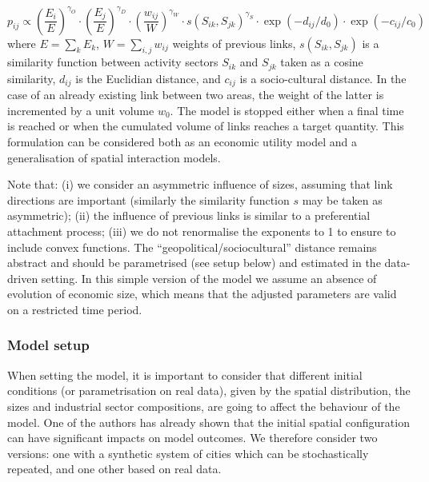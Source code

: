 \documentclass[10pt,letterpaper]{article}
\begin{document}
\begin{equation}
p_{ij} \propto \left(\frac{E_{i}}{E}\right)^{\gamma_O} \cdot \left(\frac{E_{j}}{E}\right)^{\gamma_D} \cdot \left(\frac{w_{ij}}{W}\right)^{\gamma_W} \cdot s\left(S_{ik},S_{jk}\right)^{\gamma_S} \cdot \exp \left(- d_{ij} / d_0\right) \cdot \exp \left(- c_{ij} / c_0\right)
\end{equation}
where $E  =  \sum_k E_k$, $W  = \sum_{i,j} w_{ij}$ weights of previous links, $s(S_{ik},S_{jk})$ is a similarity function between activity sectors $S_{ik}$ and $S_{jk}$ taken as a cosine similarity, $d_{ij}$ is the Euclidian distance, and $c_{ij}$ is a socio-cultural distance. In the case of an already existing link between two areas, the weight of the latter is incremented by a unit volume $w_0$. The model is stopped either when a final time is reached or when the cumulated volume of links reaches a target quantity. This formulation can be considered both as an economic utility model and a generalisation of spatial interaction models.



Note that: (i) we consider an asymmetric influence of sizes, assuming that link directions are important (similarly the similarity function $s$ may be taken as asymmetric); (ii) the influence of previous links is similar to a preferential attachment process; (iii) we do not renormalise the exponents to 1 
to ensure to include convex functions. The ``geopolitical/sociocultural'' distance remains abstract and should be parametrised (see setup below) and estimated in the data-driven setting. In this simple version of the model we assume an absence of evolution of economic size, which means that the adjusted parameters are valid on a restricted time period.


\subsubsection*{Model setup}

When setting the model, it is important to consider that different initial conditions (or parametrisation on real data), given by the spatial distribution, the sizes and industrial sector compositions, are going to affect the behaviour of the model. One of the authors \cite{raimbault2019space} has already shown that the initial spatial configuration can have significant impacts on model outcomes. We therefore consider two versions: one with a synthetic system of cities which can be stochastically repeated, and one other based on real data.
\end{document}
